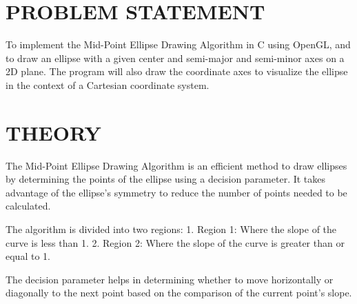\documentclass{article}
\begin{document}
\section*{PROBLEM STATEMENT}
To implement the Mid-Point Ellipse Drawing Algorithm in C using OpenGL, and to draw an ellipse with a given center and semi-major and semi-minor axes on a 2D plane. The program will also draw the coordinate axes to visualize the ellipse in the context of a Cartesian coordinate system.

\section*{THEORY}
The Mid-Point Ellipse Drawing Algorithm is an efficient method to draw ellipses by determining the points of the ellipse using a decision parameter. It takes advantage of the ellipse's symmetry to reduce the number of points needed to be calculated. 

The algorithm is divided into two regions:
1. Region 1: Where the slope of the curve is less than 1.
2. Region 2: Where the slope of the curve is greater than or equal to 1.

The decision parameter helps in determining whether to move horizontally or diagonally to the next point based on the comparison of the current point's slope.
\end{document}
